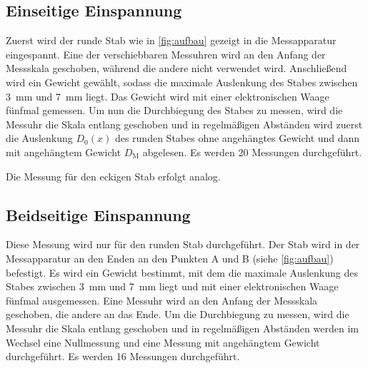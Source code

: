 \subsection{Einseitige Einspannung}

    Zuerst wird der runde Stab wie in \autoref{fig:aufbau} gezeigt in die Messapparatur eingespannt.
    Eine der verschiebbaren Messuhren wird an den Anfang der Messskala geschoben, während die andere
    nicht verwendet wird.
    Anschließend wird ein Gewicht gewählt, sodass die maximale Auslenkung des Stabes zwischen \SI{3}{\milli\meter} und \SI{7}{\milli\meter} liegt.
    Das Gewicht wird mit einer elektronischen Waage fünfmal gemessen.
    Um nun die Durchbiegung des Stabes zu messen, wird die Messuhr die Skala entlang geschoben und in
    regelmäßigen Abständen wird zuerst die Auslenkung $D_0(x)$ des runden Stabes ohne angehängtes Gewicht
    und dann mit angehängtem Gewicht $D_\text{M}$ abgelesen.
    Es werden 20 Messungen durchgeführt.

    Die Messung für den eckigen Stab erfolgt analog.

\subsection{Beidseitige Einspannung}

    Diese Messung wird nur für den runden Stab durchgeführt.
    Der Stab wird in der Messapparatur an den Enden an den Punkten A und B (siehe \autoref{fig:aufbau})
    befestigt.
    Es wird ein Gewicht bestimmt, mit dem die maximale Auslenkung des Stabes zwischen \SI{3}{\milli\meter} und \SI{7}{\milli\meter} liegt
    und mit einer elektronischen Waage fünfmal ausgemessen.
    Eine Messuhr wird an den Anfang der Messskala geschoben, die andere an das Ende.
    Um die Durchbiegung zu messen, wird die Messuhr die Skala entlang geschoben und in regelmäßigen Abständen
    werden im Wechsel eine Nullmessung und eine Messung mit angehängtem Gewicht durchgeführt.
    Es werden 16 Messungen durchgeführt.
